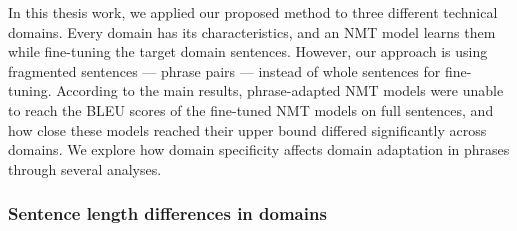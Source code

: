 In this thesis work, we applied our proposed method to three different technical domains. Every domain has its characteristics, and an NMT model learns them while fine-tuning the target domain sentences. However, our approach is using fragmented sentences --- phrase pairs --- instead of whole sentences for fine-tuning. 
According to the main results, phrase-adapted NMT models were unable to reach the BLEU scores of the fine-tuned NMT models on full sentences, and how close these models reached their upper bound differed significantly across domains. We explore how domain specificity affects domain adaptation in phrases through several analyses.

\subsubsection{Sentence length differences in domains}

